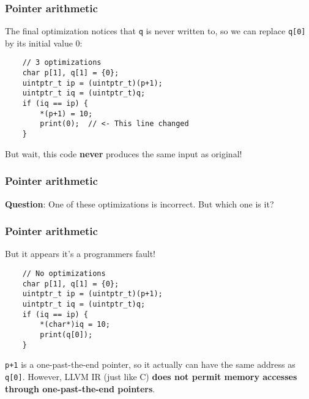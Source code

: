 \documentclass[aspectratio=1610,t]{beamer}
\begin{document}

\begin{frame}[fragile]
\frametitle{Pointer arithmetic}
The final optimization notices that \texttt{q} is never written to, so we can replace \texttt{q[0]} by its initial value 0:

\begin{verbatim}
    // 3 optimizations
    char p[1], q[1] = {0};
    uintptr_t ip = (uintptr_t)(p+1);
    uintptr_t iq = (uintptr_t)q;
    if (iq == ip) {
        *(p+1) = 10;
        print(0);  // <- This line changed
    }
\end{verbatim}

But wait, this code \textbf{never} produces the same input as original!
\end{frame}


\begin{frame}[fragile]
\frametitle{Pointer arithmetic}
\textbf{Question}: One of these optimizations is incorrect. But which one is it?


\end{frame}


\begin{frame}[fragile]
\frametitle{Pointer arithmetic}
But it appears it's a programmers fault!

\begin{verbatim}
    // No optimizations
    char p[1], q[1] = {0};
    uintptr_t ip = (uintptr_t)(p+1);
    uintptr_t iq = (uintptr_t)q;
    if (iq == ip) {
        *(char*)iq = 10;
        print(q[0]);
    }
\end{verbatim}

\texttt{p+1} is a one-past-the-end pointer, so it actually can have the same address as \texttt{q[0]}. However, LLVM IR (just like C) \textbf{does not permit memory accesses through one-past-the-end pointers}.
\end{frame}
\end{document}
